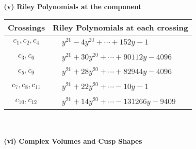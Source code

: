 \documentclass[1p]{elsarticle_modified}
\theoremstyle{definition}
\begin{document}
\newpage\renewcommand{\arraystretch}{1}
\flushleft \textbf{(v) Riley Polynomials at the component}\newline \\
\begin{tabular}{m{50pt}|m{274pt}}
Crossings & \hspace{64pt}Riley Polynomials at each crossing \\
\hline $$\begin{aligned}c_{1},c_{2},c_{4}\end{aligned}$$&$\begin{aligned}
&y^{21}-4 y^{20}+\cdots+152 y-1
\end{aligned}$\\
\hline $$\begin{aligned}c_{3},c_{6}\end{aligned}$$&$\begin{aligned}
&y^{21}+30 y^{20}+\cdots+90112 y-4096
\end{aligned}$\\
\hline $$\begin{aligned}c_{5},c_{9}\end{aligned}$$&$\begin{aligned}
&y^{21}+28 y^{20}+\cdots+82944 y-4096
\end{aligned}$\\
\hline $$\begin{aligned}c_{7},c_{8},c_{11}\end{aligned}$$&$\begin{aligned}
&y^{21}+22 y^{20}+\cdots-10 y-1
\end{aligned}$\\
\hline $$\begin{aligned}c_{10},c_{12}\end{aligned}$$&$\begin{aligned}
&y^{21}+14 y^{20}+\cdots-131266 y-9409
\end{aligned}$\\
\hline
\end{tabular}\\~\\
\newpage\flushleft \textbf{(vi) Complex Volumes and Cusp Shapes}
\end{document}
